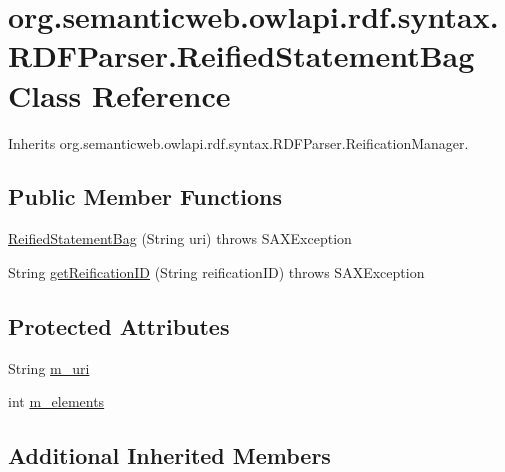 \hypertarget{classorg_1_1semanticweb_1_1owlapi_1_1rdf_1_1syntax_1_1_r_d_f_parser_1_1_reified_statement_bag}{\section{org.\-semanticweb.\-owlapi.\-rdf.\-syntax.\-R\-D\-F\-Parser.\-Reified\-Statement\-Bag Class Reference}
\label{classorg_1_1semanticweb_1_1owlapi_1_1rdf_1_1syntax_1_1_r_d_f_parser_1_1_reified_statement_bag}
}


Inherits org.\-semanticweb.\-owlapi.\-rdf.\-syntax.\-R\-D\-F\-Parser.\-Reification\-Manager.

\subsection*{Public Member Functions}
\begin{DoxyCompactItemize}
\item 
\hyperlink{classorg_1_1semanticweb_1_1owlapi_1_1rdf_1_1syntax_1_1_r_d_f_parser_1_1_reified_statement_bag_a69a800632fb6d0351e42249fe4fe1f28}{Reified\-Statement\-Bag} (String uri)  throws S\-A\-X\-Exception 
\item 
String \hyperlink{classorg_1_1semanticweb_1_1owlapi_1_1rdf_1_1syntax_1_1_r_d_f_parser_1_1_reified_statement_bag_a23bda660c59a5d3622dbf476db1015cc}{get\-Reification\-I\-D} (String reification\-I\-D)  throws S\-A\-X\-Exception 
\end{DoxyCompactItemize}
\subsection*{Protected Attributes}
\begin{DoxyCompactItemize}
\item 
String \hyperlink{classorg_1_1semanticweb_1_1owlapi_1_1rdf_1_1syntax_1_1_r_d_f_parser_1_1_reified_statement_bag_adb7347d2ad7c449a9220abe424344300}{m\-\_\-uri}
\item 
int \hyperlink{classorg_1_1semanticweb_1_1owlapi_1_1rdf_1_1syntax_1_1_r_d_f_parser_1_1_reified_statement_bag_ac1bd222ecf85eb03c582208f49e7fb84}{m\-\_\-elements}
\end{DoxyCompactItemize}
\subsection*{Additional Inherited Members}


